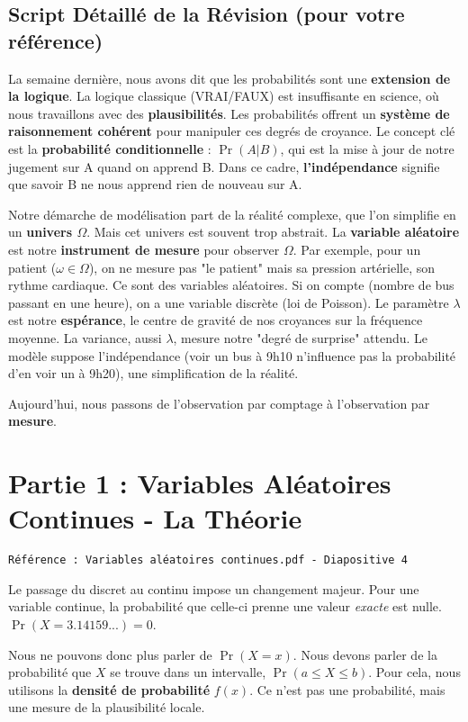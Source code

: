 \documentclass[12pt, a4paper]{article}
\newcommand{\slidenote}[1]{%
    \par\vspace{1.5ex}%
    \noindent\texttt{\small\color{gray}#1}\par\nopagebreak\vspace{1.5ex}%
}
\begin{document}
\subsection*{Script Détaillé de la Révision (pour votre référence)}

La semaine dernière, nous avons dit que les probabilités sont une \textbf{extension de la logique}. La logique classique (VRAI/FAUX) est insuffisante en science, où nous travaillons avec des \textbf{plausibilités}. Les probabilités offrent un \textbf{système de raisonnement cohérent} pour manipuler ces degrés de croyance. Le concept clé est la \textbf{probabilité conditionnelle} : $\Pr(A|B)$, qui est la mise à jour de notre jugement sur A quand on apprend B. Dans ce cadre, \textbf{l'indépendance} signifie que savoir B ne nous apprend rien de nouveau sur A.

Notre démarche de modélisation part de la réalité complexe, que l'on simplifie en un \textbf{univers $\Omega$}. Mais cet univers est souvent trop abstrait. La \textbf{variable aléatoire} est notre \textbf{instrument de mesure} pour observer $\Omega$. Par exemple, pour un patient ($\omega \in \Omega$), on ne mesure pas "le patient" mais sa pression artérielle, son rythme cardiaque. Ce sont des variables aléatoires. Si on compte (nombre de bus passant en une heure), on a une variable discrète (loi de Poisson). Le paramètre $\lambda$ est notre \textbf{espérance}, le centre de gravité de nos croyances sur la fréquence moyenne. La variance, aussi $\lambda$, mesure notre "degré de surprise" attendu. Le modèle suppose l'indépendance (voir un bus à 9h10 n'influence pas la probabilité d'en voir un à 9h20), une simplification de la réalité.

Aujourd'hui, nous passons de l'observation par comptage à l'observation par \textbf{mesure}.

\section*{Partie 1 : Variables Aléatoires Continues - La Théorie}

\slidenote{Référence : Variables aléatoires continues.pdf - Diapositive 4}
Le passage du discret au continu impose un changement majeur. Pour une variable continue, la probabilité que celle-ci prenne une valeur \textit{exacte} est nulle. $\Pr(X = 3.14159...) = 0$.

Nous ne pouvons donc plus parler de $\Pr(X=x)$. Nous devons parler de la probabilité que $X$ se trouve dans un intervalle, $\Pr(a \le X \le b)$. Pour cela, nous utilisons la \textbf{densité de probabilité} $f(x)$. Ce n'est pas une probabilité, mais une mesure de la plausibilité locale.
\end{document}
